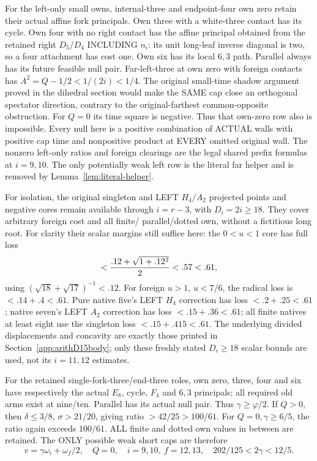 \documentclass[11pt]{article}
\begin{document}
For the left-only small owns, internal-three and
endpoint-four own zero retain their actual affine
fork principals.
Own three with a white-three contact has its cycle.
Own four with no right contact has the affine
principal obtained from the retained right
\(D_5/D_4\) INCLUDING \(n_i\):
its unit long-leaf inverse diagonal is two,
so a four attachment has cost one.
Own six has its local \(6,3\) path.
Parallel always has its future feasible null pair.
Far-left-three at own zero with foreign contacts
has \(A^2=Q-1/2<1/(2i)<1/4\).
The original small-time shadow argument proved
in the dihedral section would make the SAME cap
close an orthogonal spectator direction, contrary
to the original-farthest common-opposite obstruction.
For \(Q=0\) its time square is negative.
Thus that own-zero row also is impossible.
Every null here is a positive combination of ACTUAL
walls with positive cap time and nonpositive product
at EVERY omitted original wall.
The nonzero left-only ratios and foreign clearings
are the legal shared prefix formulas at \(i=9,10\).
The only potentially weak left row is the literal
far helper and is removed by
Lemma~\ref{lem:literal-helper}.

For isolation, the original singleton and LEFT
\(H_4/A_2\) projected points and negative cores
remain available through \(i=r-3\), with \(D_i=2i\ge18\).
They cover arbitrary foreign cost and all finite/
parallel/dotted own, without a fictitious long root.
For clarity their scalar margins still suffice here:
the \(0<u<1\) core has full loss
\[
             <{.12+\sqrt{1+.12^2}\over2}<.57<.61,
\]
using \((\sqrt{18}+\sqrt{17})^{-1}<.12\).
For foreign \(u>1\), \(u<7/6\), the radical
loss is \(<.14+.4<.61\).
Pure native five's LEFT \(H_4\) correction has
loss \(<.2+.25<.61\);
native seven's LEFT \(A_2\) correction has
loss \(<.15+.36<.61\);
all finite natives at least eight use the
singleton loss \(<.15+.415<.61\).
The underlying divided displacements and concavity
are exactly those printed in
Section~\ref{app:arithD15body};
only these freshly stated \(D_i\ge18\) scalar
bounds are used, not its \(i=11,12\) estimates.

For the retained single-fork-three/end-three roles,
own zero, three, four and six have respectively
the actual \(E_8\), cycle, \(F_4\) and \(6,3\)
principals; all required old arms exist at nine/ten.
Parallel has its actual null pair.
Thus \(\gamma\ge\varphi/2\).
If \(Q>0\), then \(\delta\le3/8\),
\(\sigma>21/20\), giving ratio \(>42/25>100/61\).
For \(Q=0,\gamma\ge6/5\), the ratio again exceeds
\(100/61\).
ALL finite and dotted own values in between
are retained.
The ONLY possible weak short caps are therefore
\[
 v=\gamma\omega_i+\omega_f/2,\quad Q=0,\quad
 i=9,10,\ f=12,13,\quad 202/125<2\gamma<12/5.
\]
\end{document}
